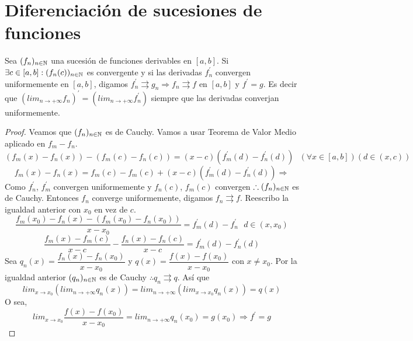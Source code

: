 \section{Diferenciación de sucesiones de funciones}

\begin{theorem}
  Sea $(f_n)_{n \in \mathbb{N}}$ una sucesión de funciones derivables en $[a, b]$. Si $\exists c \in [a, b] : (f_n(c))_{n \in \mathbb{N}}$ es convergente y si las derivadas $f_n^{\prime}$ convergen uniformemente en $[a, b]$, digamos $f_n^{\prime} \rightrightarrows g_n \Rightarrow f_n \rightrightarrows f$ en $[a, b]$ y $f^{\prime} = g$.
  Es decir que $(lim_{n \to +\infty} f_n)^{\prime} = (lim_{n \to +\infty} f_n^{\prime})$ siempre que las derivadas converjan uniformemente.
  \begin{proof}
    Veamos que $(f_n)_{n \in \mathbb{N}}$ es de Cauchy. Vamos a usar Teorema de Valor Medio aplicado en $f_m - f_n$. \begin{equation}
      (f_m(x) - f_n(x)) - (f_m(c) - f_n(c)) = (x-c)(f_m^{\prime}(d) - f_n^{\prime}(d)) \text{  } (\forall x \in [a, b])(d \in (x, c))
    \end{equation}
    \begin{equation}
      f_m(x) - f_n(x) = f_m(c) - f_m(c) + (x-c) (f_m^{\prime}(d) - f_n^{\prime}(d)) \Rightarrow
    \end{equation} Como $f_n^{\prime}$, $f_m^{\prime}$ convergen uniformemente y $f_n(c)$, $f_m(c)$ convergen $\therefore (f_n)_{n \in \mathbb{N}}$ es de Cauchy. Entonces $f_n$ converge uniformemente, digamos $f_n \rightrightarrows f$. Reescribo la igualdad anterior con $x_0$ en vez de $c$.
    \begin{equation}
      \dfrac{f_m(x_0) - f_n(x) - (f_m(x_0) - f_n(x_0))}{x - x_0} = f_m^{\prime}(d) - f_n^{\prime} \text{  } d \in (x, x_0)
    \end{equation}
    \begin{equation}
      \dfrac{f_m(x) - f_m(c)}{x - c} - \dfrac{f_n(x) - f_n(c)}{x - c} = f_m^{\prime}(d) - f_n^{\prime}(d)
    \end{equation}
    Sea $q_n(x) = \dfrac{f_n(x)-f_n(x_0)}{x-x_0}$ y $q(x) = \dfrac{f(x)-f(x_0)}{x - x_0}$ con $x \neq x_0$. Por la igualdad anterior $(q_n)_{n \in \mathbb{N}}$ es de Cauchy $\therefore q_n \rightrightarrows q$. Así que \begin{equation}
      lim_{x \to x_0} (lim_{n \to +\infty} q_n(x)) = lim_{n \to +\infty}(lim_{x \to x_0} q_n(x)) = q(x)
    \end{equation} O sea, \begin{equation}
      lim_{x \to x_0} \dfrac{f(x) - f(x_0)}{x-x_0} = lim_{n \to +\infty} q_n(x_0) = g(x_0) \Rightarrow f^{\prime} = g
    \end{equation} 
  \end{proof} 
\end{theorem}

